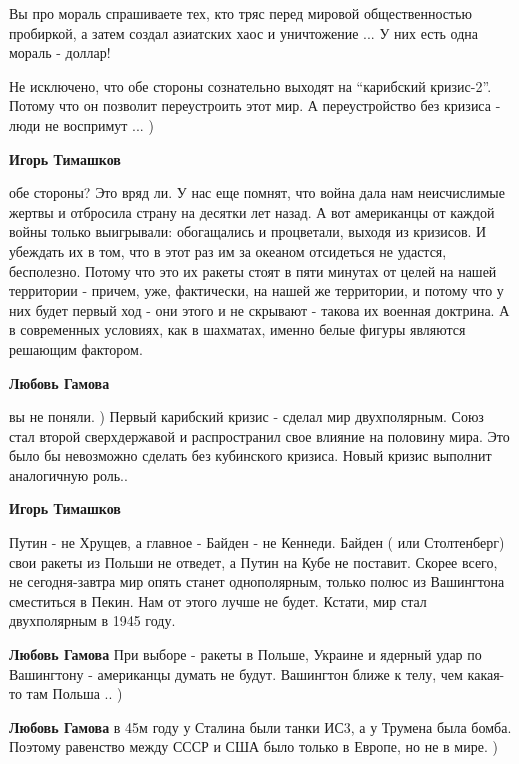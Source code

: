 \begin{itemize}

Вы про мораль спрашиваете тех, кто тряс перед мировой общественностью
пробиркой, а затем создал азиатских хаос и уничтожение ... У них есть одна
мораль - доллар!



Не исключено, что обе стороны сознательно выходят на \enquote{карибский кризис-2}.
Потому что он позволит переустроить этот мир. А переустройство без кризиса -
люди не воспримут ... )

\begin{itemize} %
\textbf{Игорь Тимашков} 

обе стороны? Это вряд ли. У нас еще помнят, что война дала нам неисчислимые
жертвы и отбросила страну на десятки лет назад. А вот американцы от каждой
войны только выигрывали: обогащались и процветали, выходя из кризисов. И
убеждать их в том, что в этот раз им за океаном отсидеться не удастся,
бесполезно. Потому что это их ракеты стоят в пяти минутах от целей на нашей
территории - причем, уже, фактически, на нашей же территории, и потому что у
них будет первый ход - они этого и не скрывают - такова их военная доктрина. А
в современных условиях, как в шахматах, именно белые фигуры являются решающим
фактором.


\textbf{Любовь Гамова} 

вы не поняли. ) Первый карибский кризис - сделал мир двухполярным. Союз стал
второй сверхдержавой и распространил свое влияние на половину мира. Это было бы
невозможно сделать без кубинского кризиса. Новый кризис выполнит аналогичную
роль..

\textbf{Игорь Тимашков} 

Путин - не Хрущев, а главное - Байден - не Кеннеди. Байден ( или Столтенберг)
свои ракеты из Польши не отведет, а Путин на Кубе не поставит. Скорее всего, не
сегодня-завтра мир опять станет однополярным, только полюс из Вашингтона
сместиться в Пекин. Нам от этого лучше не будет. Кстати, мир стал двухполярным
в 1945 году.


\textbf{Любовь Гамова} При выборе - ракеты в Польше, Украине и ядерный удар по Вашингтону - американцы думать не будут. Вашингтон ближе к телу, чем какая-то там Польша .. )

\textbf{Любовь Гамова} в 45м году у Сталина были танки ИС3, а у Трумена была бомба. Поэтому равенство между СССР и США было только в Европе, но не в мире. )


\end{itemize}
\end{itemize}
